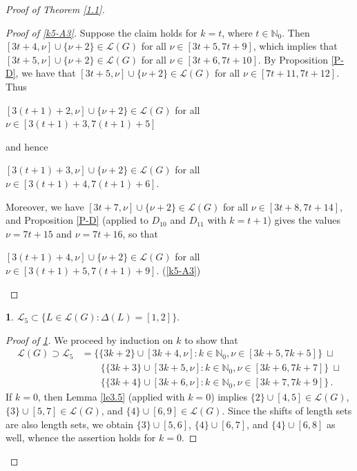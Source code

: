 \documentclass[a4paper, 10pt]{amsart}
\theoremstyle{plain}
\theoremstyle{definition}
\theoremstyle{definition}
\newtheorem{claim}{}[theorem]
\newcommand{\N}{\mathbb N}
\numberwithin{equation}{section}
\begin{document}
\begin{proof}[Proof of Theorem \ref{1.1}]
\begin{proof}[Proof of \ref{k5-A3}]
Suppose the claim  holds for $k=t$, where $t\in \N_0$. Then $[3t+4, \nu]\cup\{\nu+2\}\in \mathcal L(G)$ for all $\nu\in [3t+5, 7t+9]$, which implies that
$[3t+5, \nu]\cup\{\nu+2\}\in \mathcal L(G) $ for all $\nu\in [3t+6, 7t+10]$. By Proposition \ref{P-D}, we have that
$[3t+5, \nu]\cup\{\nu+2\}\in \mathcal L(G) $ for all $\nu\in [7t+11, 7t+12]$. Thus
\begin{center}
$[3(t+1)+2, \nu]\cup\{\nu+2\}\in \mathcal L(G) $ for all $\nu\in [3(t+1)+3, 7(t+1)+5]$
\end{center}
 and hence 
\begin{center}
$[3(t+1)+3, \nu]\cup\{\nu+2\}\in \mathcal L(G) $ for all $\nu\in [3(t+1)+4, 7(t+1)+6]$.
\end{center}
Moreover, we have $[3t+7, \nu]\cup\{\nu+2\}\in \mathcal L(G) $ for all $\nu\in [3t+8, 7t+14]$, and Proposition \ref{P-D} (applied to $D_{10}$ and $D_{11}$ with $k=t+1$) gives the values $\nu = 7t+15$ and $\nu = 7t+16$, so that
\begin{center}
\hspace{2cm}$[3(t+1)+4, \nu]\cup\{\nu+2\}\in \mathcal L(G) $ for all $\nu\in [3(t+1)+5, 7(t+1)+9]$. \qedhere (\ref{k5-A3})
\end{center}
\end{proof}


\begin{claim}\label{k5-S3} $\mathcal L_5\subset \big\{ L\in \mathcal L(G)\colon \Delta (L)=[1,2] \big\}$.
\end{claim}

\begin{proof}[Proof of \ref{k5-S3}]
We proceed by induction on $k$ to show that
	\begin{align*}
	\mathcal L(G)\supset \mathcal L_5
		&=\big\{\{3k+2\}\cup[3k+4,\nu] \colon k \in \N_0, \nu\in [3k+5, 7k+5] \big\} \ \sqcup \\
		&\quad\quad  \big\{\{3k+3\}\cup[3k+5,\nu] \colon k \in \N_0, \nu\in [3k+6, 7k+7] \big\} \ \sqcup\\
		&\quad\quad \big\{\{3k+4\}\cup[3k+6,\nu] \colon k \in \N_0, \nu\in [3k+7, 7k+9] \big\}\,.
		\end{align*}
	 If $k=0$, then Lemma
	\ref{le3.5} (applied with $k=0$) implies
	$\{2\}\cup [4,5]\in \mathcal L(G)$, $\{3\}\cup [5,7]\in \mathcal L(G)$, and $\{4\}\cup [6,9]\in \mathcal L(G)$. Since the shifts of length sets are  also length sets, we obtain  $\{3\}\cup [5,6]$, $\{4\}\cup [6,7]$, and $\{4\}\cup [6,8]$ as well, whence the assertion holds for $k=0$.
	

\end{proof}
\end{proof}
\end{document}
